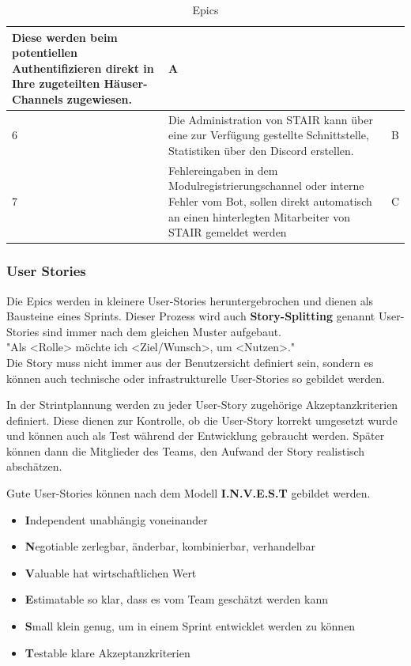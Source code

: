 \documentclass[a4paper, table]{article}
\begin{document}
\begin{table}[h]
\begin{tabular}{ | p{1em} | p{35em} | p{2em} |}
        Diese werden beim potentiellen Authentifizieren direkt in Ihre zugeteilten Häuser-Channels zugewiesen. & A \\
        \hline
        6 & Die Administration von STAIR kann über eine zur Verfügung gestellte Schnittstelle, Statistiken über
        den Discord erstellen. & B \\
        \hline
        7 & Fehlereingaben in dem Modulregistrierungschannel oder interne Fehler vom Bot, sollen direkt automatisch
        an einen hinterlegten Mitarbeiter von STAIR gemeldet werden & C \\
        \hline
    \end{tabular}
    \caption{Epics}
    \label{tab: Epics}
\end{table}

\subsubsection{User Stories}
Die Epics werden in kleinere User-Stories heruntergebrochen und dienen als Bausteine eines Sprints.
Dieser Prozess wird auch \textbf{Story-Splitting} genannt
User-Stories sind immer nach dem gleichen Muster aufgebaut. \\
"Als <Rolle> möchte ich <Ziel/Wunsch>, um <Nutzen>." \\
Die Story muss nicht immer aus der Benutzersicht definiert sein, sondern es können auch technische oder
infrastrukturelle User-Stories so gebildet werden.

In der Strintplannung werden zu jeder User-Story zugehörige Akzeptanzkriterien definiert.
Diese dienen zur Kontrolle, ob die User-Story korrekt umgesetzt wurde und
können auch als Test während der Entwicklung gebraucht werden.
Später können dann die Mitglieder des Teams, den Aufwand der Story realistisch abschätzen.

Gute User-Stories können nach dem Modell \textbf{I.N.V.E.S.T} gebildet werden. \autocite{hammerschall_software_2013} %
\begin{itemize}
    \item \textbf{I}ndependent  unabhängig voneinander
    \item \textbf{N}egotiable   zerlegbar, änderbar, kombinierbar, verhandelbar
    \item \textbf{V}aluable     hat wirtschaftlichen Wert
    \item \textbf{E}stimatable  so klar, dass es vom Team geschätzt werden kann
    \item \textbf{S}mall        klein genug, um in einem Sprint entwicklet werden zu können
    \item \textbf{T}estable     klare Akzeptanzkriterien
\end{itemize}
\end{document}
